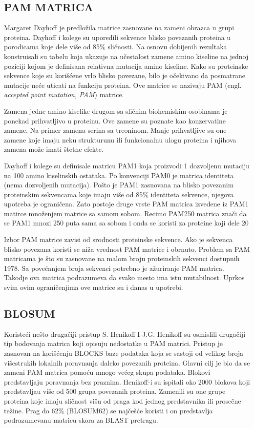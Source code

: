 \subsection{PAM MATRICA}
Margaret Dayhoff je predložila matrice zasnovane na zameni obrazca u grupi proteina. Dayhoff i kolege su uporedili sekvence blisko povezanih proteina u porodicama koje dele više od 85\% sličnosti. Na osnovu dobijenih rezultaka konstruisali su tabelu koja ukazuje na učestalost zamene amino kiseline na jednoj poziciji kojom je definisana relativna mutacija amino kiseline. Kako su proteinske sekvence koje su korišćene vrlo blisko povezane, bilo je očekivano da posmatrane mutacije neće uticati na funkciju proteina. Ove matrice se nazivaju PAM (engl. \textit{accepted point mutation, PAM}) matrice.

Zamena jedne amino kiselike drugom sa sličnim biohemiskim osobinama je ponekad prihvatljivo u proteinu. Ove zamene su poznate kao konzervatine zamene. Na primer zamena serina sa treoninom. Manje prihvatljive su one zamene koje imaju neku strukturunu ili funkcionalnu ulogu proteina i njihova zamena može imati štetne efekte. 

Dayhoff i kolege su definisale matricu PAM1 koja proizvodi 1 dozvoljenu mutaciju na 100 amino kiselinskih ostataka. Po konvenciji PAM0 je matrica identiteta (nema dozvoljenih mutacija).  Pošto je PAM1 zasnovana na blisko povezanim proteinskim sekvencama koje imaju više od 85\% identiteta sekvence, njegova upotreba je ograničena. Zato postoje druge vrste PAM matrica izvedene iz PAM1 matirce množenjem matrice sa samom sobom. Recimo PAM250 matrica znači da se PAM1 mnozi 250 puta sama sa sobom i onda se koristi za proteine koji dele 20%

Izbor PAM matrice zavisi od srodnosti proteinske sekvence. Ako je sekvenca blisko povezana koristi se niža vrednost PAM matrice i obrnuto. Problem sa PAM matricama je što su zasnovane na malom broju proteinskih sekvenci dostupnih 1978. Sa povećanjem broja sekvenci potrebno je ažuriranje PAM matrica. Takodje ova matrica podrazumeva da svako mesto ima istu mutabilnost. Uprkos svim ovim ograničenjima ove matrice su i danas u upotrebi. 


\subsection{BLOSUM}
Koristeći nešto drugačiji pristup S. Henikoff I J.G. Henikoff su osmislili drugačiji tip bodovanja matrica koji opisuju nedostatke u PAM matrici. Pristup je zasnovan na korišćenju BLOCKS baze podataka koja se sastoji od velikog broja višestrukih lokalnih poravnanja daleko povezanih proteina. Glavni cilj je bio da se zameni PAM matrica pomoću mnogo većeg skupa podataka. Blokovi predstavljaju poravnanja bez praznina. Henikoff-i su ispitali oko 2000 blokova koji predstavljau više od 500 grupa povezanih proteina. Zamenili su one grupe proteina koje imaju sličnost višu od praga kod jednog predstavnika ili prosečne težine. Prag do 62\% (BLOSUM62) se najčešće koristi i on predstavlja podrazumevanu matricu skora za BLAST pretragu.

